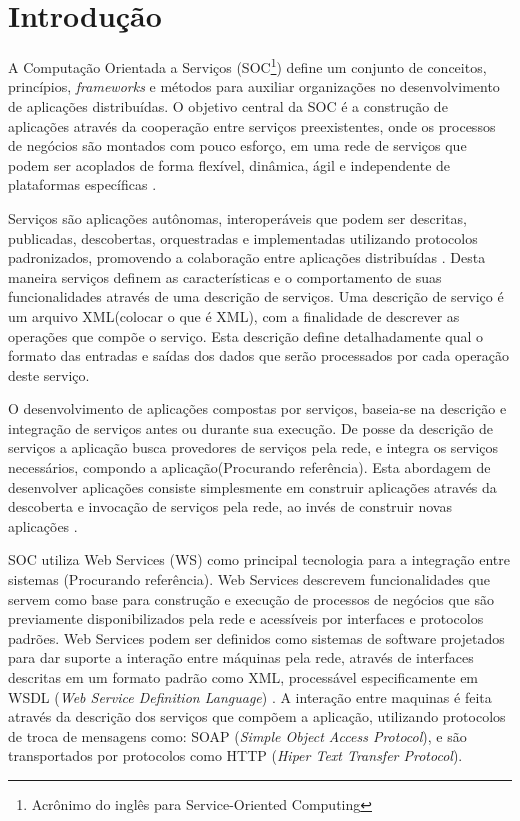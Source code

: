 \chapter{Introdução}
\label{introduction}

A Computação Orientada a Serviços (SOC\footnote{Acrônimo do inglês para Service-Oriented Computing}) define um conjunto de conceitos, princípios, \textit{frameworks} e métodos para auxiliar organizações no desenvolvimento de aplicações distribuídas. O objetivo central da SOC é a construção de aplicações através da cooperação entre serviços preexistentes, onde os processos de negócios são montados com pouco esforço, em uma rede de serviços que podem ser acoplados de forma flexível, dinâmica, ágil e independente de plataformas específicas \cite{papazoglou_et_al:2006}.

Serviços são aplicações autônomas, interoperáveis que podem ser descritas, publicadas, descobertas, orquestradas e implementadas utilizando protocolos padronizados, promovendo a colaboração entre aplicações distribuídas \cite{Dustdar:2008}. %
Desta maneira serviços definem as características e o comportamento de suas funcionalidades através de uma descrição de serviços. Uma descrição de serviço é um arquivo XML(colocar o que é XML), com a finalidade de descrever as operações que compõe o serviço. Esta descrição define detalhadamente qual o formato das entradas e saídas dos dados que serão processados por cada operação deste serviço. 

O desenvolvimento de aplicações compostas por serviços, baseia-se na descrição e integração de serviços antes ou durante sua execução. De posse da descrição de serviços a aplicação busca provedores de serviços pela rede, e integra os serviços necessários, compondo a aplicação(Procurando referência). Esta abordagem de desenvolver aplicações consiste simplesmente em construir aplicações através da descoberta e invocação de serviços pela rede, ao invés de construir novas aplicações \cite{papazoglou_et_al:2006}.

SOC utiliza Web Services (WS) como principal tecnologia para a integração entre sistemas (Procurando referência). Web Services descrevem funcionalidades que servem como base para construção e execução de processos de negócios que são previamente disponibilizados pela rede e acessíveis por interfaces e protocolos padrões. Web Services podem ser definidos como sistemas de software projetados para dar suporte a interação entre máquinas pela rede, através de interfaces descritas em um formato padrão como XML, processável especificamente em WSDL (\textit{Web Service Definition Language}) \cite{w3c_webService}. A interação entre maquinas é feita através da descrição dos serviços que compõem a aplicação, utilizando protocolos de troca de mensagens como: SOAP (\textit{Simple Object Access Protocol}), e são transportados por protocolos como HTTP (\textit{Hiper Text Transfer Protocol}).



